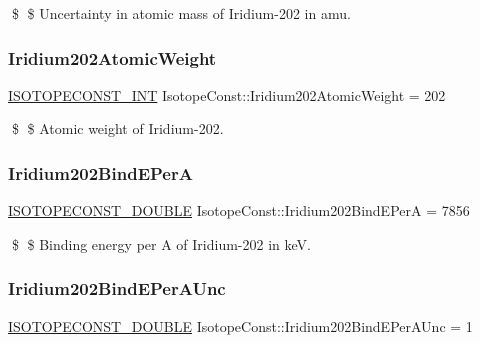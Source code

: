 \$ \$ Uncertainty in atomic mass of Iridium-\/202 in amu. \mbox{\label{group___isotope_const-_iridium-_ir202_ga9ab5e9c8006985bad19f5ed3f385455e}} 
\subsubsection{\texorpdfstring{Iridium202\+Atomic\+Weight}{Iridium202AtomicWeight}}
{\footnotesize\ttfamily \mbox{\hyperlink{group___isotope_const-_macros_ga5f18360b3e99483a35c32d789e62621c}{I\+S\+O\+T\+O\+P\+E\+C\+O\+N\+S\+T\+\_\+\+I\+NT}} Isotope\+Const\+::\+Iridium202\+Atomic\+Weight = 202}

\$ \$ Atomic weight of Iridium-\/202. \mbox{\label{group___isotope_const-_iridium-_ir202_ga4c242b1a3e8b8390febd2e43ae174e65}} 
\subsubsection{\texorpdfstring{Iridium202\+Bind\+E\+PerA}{Iridium202BindEPerA}}
{\footnotesize\ttfamily \mbox{\hyperlink{group___isotope_const-_macros_ga8f45a7272ce02c0b4c65c44636ed719a}{I\+S\+O\+T\+O\+P\+E\+C\+O\+N\+S\+T\+\_\+\+D\+O\+U\+B\+LE}} Isotope\+Const\+::\+Iridium202\+Bind\+E\+PerA = 7856}

\$ \$ Binding energy per A of Iridium-\/202 in keV. \mbox{\label{group___isotope_const-_iridium-_ir202_gae593c342a84950b45beb63f2ff722bfb}} 
\subsubsection{\texorpdfstring{Iridium202\+Bind\+E\+Per\+A\+Unc}{Iridium202BindEPerAUnc}}
{\footnotesize\ttfamily \mbox{\hyperlink{group___isotope_const-_macros_ga8f45a7272ce02c0b4c65c44636ed719a}{I\+S\+O\+T\+O\+P\+E\+C\+O\+N\+S\+T\+\_\+\+D\+O\+U\+B\+LE}} Isotope\+Const\+::\+Iridium202\+Bind\+E\+Per\+A\+Unc = 1}

